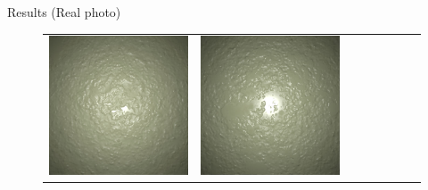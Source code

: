 \documentclass[final]{beamer}
\newlength{\twocolwid}
\newlength{\resultwidth}
\begin{document}
\begin{frame}[t]
\begin{columns}[t]
\begin{column}{\twocolwid}
\begin{block}{Results (Real photo)}
\begin{figure}[t]
\begin{tabular}{ccrclccc}
            		\includegraphics[width=\resultwidth]{images/real/plaster/good2.jpg} &
            		\includegraphics[width=\resultwidth]{images/real/plaster/good3.jpg} &

\end{tabular}
\end{figure}
\end{block}
\end{column}
\end{columns}
\end{frame}
\end{document}
